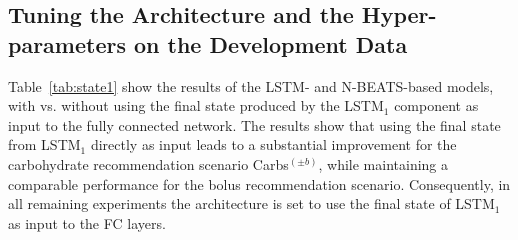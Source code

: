 \documentclass[journal,article,submit,moreauthors,pdftex]{Definitions/mdpi}
\begin{document}
\subsection{Tuning the Architecture and the Hyper-parameters on the Development Data}
\label{sec:development}

Table~\ref{tab:state1} show the results of the LSTM- and N-BEATS-based models, with vs. without using the final state produced by the LSTM$_1$ component as input to the fully connected network. The results show that using the final state from LSTM$_1$ directly as input leads to a substantial improvement for the carbohydrate recommendation scenario Carbs$^{(\pm b)}$, while maintaining a comparable performance for the bolus recommendation scenario. Consequently, in all remaining experiments the architecture is set to use the final state of LSTM$_1$ as input to the FC layers.
\end{document}
